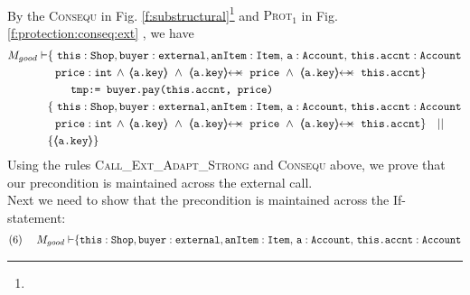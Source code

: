 \begin{proofO}
\normalsize
\\

By the \textsc{Consequ} in Fig. \ref{f:substructural}\footnote{}
 and \textsc{Prot$_1$} in Fig. \ref{f:protection:conseq:ext} , we have
\small
\begin{align*}
M_{good} \vdash & \{ \ \prg{this}:\prg{Shop}, \prg{buyer} : \prg{external}, \prg{anItem} : \prg{Item},\, \prg{a}:\prg{Account},\, \prg{this.accnt}:\prg{Account}\\
				& \ \ \prg{price} : \prg{int} \,
				  \wedge\, 
				  {\inside{\prg{a.key}}}\ \wedge\ 
				  \protectedFrom{\prg{a.key}}{\prg{price}}\ \wedge\ 
				   \protectedFrom{\prg{a.key}}{\prg{this.accnt}}\} \\
		  		& \SPTG \prg{tmp:= buyer.pay(this.accnt, price)}\ \\  
		  		& \{ \  \prg{this}:\prg{Shop}, \prg{buyer} : \prg{external}, \prg{anItem} : \prg{Item},\, \prg{a}:\prg{Account},\, \prg{this.accnt}:\prg{Account}\\
				& \ \ \prg{price} : \prg{int}\,
				  \wedge\, 
				  {\inside{\prg{a.key}}}\ \wedge\ 
				  \protectedFrom{\prg{a.key}}{\prg{price}}\ \wedge\ 
				   \protectedFrom{\prg{a.key}}{\prg{this.accnt}}\} \ \ \  || \ \ \ \\
		  		& \{ {\inside{\prg{a.key}}} \}
\end{align*}
\normalsize
Using the rules \textsc{Call\_Ext\_Adapt\_Strong} and \textsc{Consequ} above, we prove that our precondition is maintained across the external call. 
\\
Next we need to show that the precondition is maintained across the If-statement:
\small
\begin{align*}
\text{(6)}  \ \ \ \ M_{good} \vdash & \{  \prg{this}:\prg{Shop}, \prg{buyer} : \prg{external}, \prg{anItem} : \prg{Item},\, \prg{a}:\prg{Account},\, \prg{this.accnt}:\prg{Account}\\

\end{align*}
\end{proofO}
